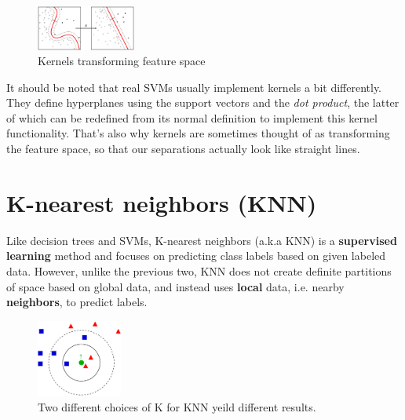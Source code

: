 \documentclass{article}
\begin{document}
\begin{figure}
  \begin{center}
    \vspace{-25pt}
    \includegraphics[width=0.29\textwidth]{kernel-transform.png}
    \vspace{-20pt}
  \end{center}
  \caption{Kernels transforming feature space}
  \vspace{-20pt}
\end{figure}
It should be noted that real SVMs usually implement kernels a bit differently. They define hyperplanes using the support vectors and the \textit{dot product}, the latter of which can be redefined from its normal definition to implement this kernel functionality. That's also why kernels are sometimes thought of as transforming the feature space, so that our separations actually look like straight lines.

\section{K-nearest neighbors (KNN)}
Like decision trees and SVMs, K-nearest neighbors (a.k.a KNN) is a \textbf{supervised learning} method and focuses on predicting class labels based on given labeled data. However, unlike the previous two, KNN does not create definite partitions of space based on global data, and instead uses \textbf{local} data, i.e. nearby \textbf{neighbors}, to predict labels.

\begin{figure}
  \begin{center}
    \vspace{-40pt}
    \includegraphics[width=0.25\textwidth]{KNN.png}
    \vspace{-30pt}
  \end{center}
  \caption{Two different choices of K for KNN yeild different results.}
  \vspace{-30pt}
\end{figure}
\end{document}
